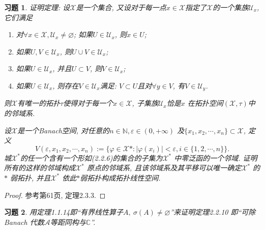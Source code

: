 \documentclass[UTF8,twoside]{ctexbook}
\newtheorem{exercise}{习题}[section]
\newcommand{\h}{\mathscr}
\newcommand{\kx}{\mathbb}
\numberwithin{equation}{section}
\begin{document}
	\begin{exercise}
		证明定理: 设$\h X$是一个集合, 又设对于每一点$x\in\h X$指定了$\h X$的一个集族$\h U_x$, 它们满足
		\begin{enumerate}[1)]
			\item 对$\forall x\in\h X,\h U_x\neq\varnothing$; 如果$U\in\h U_x$, 则$x\in U$;
			\item 如果$U,V\in \h U_x$, 则$U\cup V\in\h U_x$;
			\item 如果$U\in\h U_x$, 并且$U\subset V$, 则$V\in\h U_x$;
			\item 如果$U\in \h U_x$, 则存在$V\in\h U_x$满足: $V\subset U$且对$\forall y\in V$, 有$V\in \h U_y$.
		\end{enumerate}
		则$\h X$有唯一的拓扑$\tau$使得对于每一个$x\in\h X$, 子集族$\h U_x$恰是$x$ 在拓扑空间$(\h X,\tau)$中的邻域系.

		设$\h X$是一个Banach空间, 对任意的$n\in\kx N, \varepsilon\in (0,+\infty)$ 及$\{x_1,x_2,\cdots,x_n\}\subset\h X$, 定义
		\[
		V(\varepsilon,x_1,x_2,\cdots,x_n):=\{\varphi\in\h X*:|\varphi(x_i)|<\varepsilon,i\in\{1,2,\cdots,n\}\}.
		\]
		城$\h X^*$的任一个含有一个形如(2.2.6)的集合的子集为$\h X^*$ 中零泛函的一个邻域. 证明所有的这样的邻域构成$\h X^*$ 原点的邻域系, 且该邻域系及其平移可以唯一确定$\h X^*$ 的$*$ 弱拓扑, 并且$\h X^*$ 依此$*$弱拓扑构成拓扑线性空间.
	\end{exercise}
	\begin{proof}
		参考\cite{xjc2004}第61页, 定理2.3.3.
	\end{proof}
	\begin{exercise}
		用定理1.1.14即“有界线性算子$A,\ \sigma(A)\neq\varnothing$”来证明定理2.2.10 即“可除Banach 代数$\h A$等距同构与$\kx C$”.
	\end{exercise}
\end{document}
